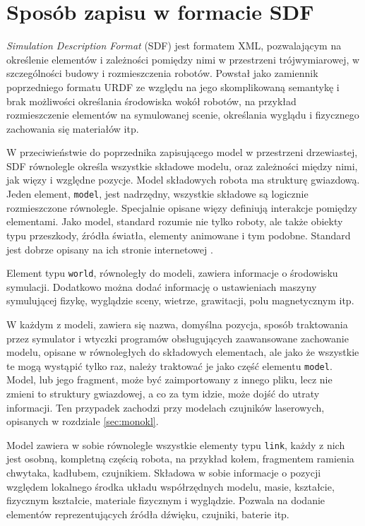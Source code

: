 \section{Sposób zapisu w formacie SDF}
	\emph{Simulation Description Format} (SDF) jest formatem XML, pozwalającym na określenie elementów i zależności pomiędzy nimi w przestrzeni trójwymiarowej, 
	w szczególności budowy i rozmieszczenia robotów.
	Powstał jako zamiennik poprzedniego formatu URDF ze względu na jego skomplikowaną semantykę i brak możliwości określania środowiska wokół robotów, 
	na przykład rozmieszczenie elementów na symulowanej scenie, określania wyglądu i fizycznego zachowania się materiałów itp.

	W przeciwieństwie do poprzednika zapisującego model w przestrzeni drzewiastej, SDF równolegle określa wszystkie składowe modelu, 
	oraz zależności między nimi, jak więzy i względne pozycje.
	Model składowych robota ma strukturę gwiazdową. Jeden element, \texttt{model}, jest nadrzędny, wszystkie składowe są logicznie rozmieszczone równolegle.
	Specjalnie opisane więzy definiują interakcje pomiędzy elementami.
	Jako model, standard rozumie nie tylko roboty, ale także obiekty typu przeszkody, źródła światła, elementy animowane i tym podobne.
	Standard jest dobrze opisany na ich stronie internetowej \cite{sdf_website}.

	Element typu \texttt{world}, równoległy do modeli, zawiera informacje o środowisku symulacji.
	Dodatkowo można dodać informację o ustawieniach maszyny symulującej fizykę, wyglądzie sceny, wietrze, grawitacji, polu magnetycznym itp.

	W każdym z modeli, zawiera się nazwa, domyślna pozycja, sposób traktowania przez symulator i wtyczki programów obsługujących zaawansowane zachowanie modelu,
	opisane w równoległych do składowych elementach, ale jako że wszystkie te mogą wystąpić tylko raz, należy traktować je jako część elementu \texttt{model}.
	Model, lub jego fragment, może być zaimportowany z innego pliku, lecz nie zmieni to struktury gwiazdowej, a co za tym idzie, może dojść do utraty informacji.
	Ten przypadek zachodzi przy modelach czujników laserowych, opisanych w rozdziale \ref{sec:monokl}.

	Model zawiera w sobie równolegle wszystkie elementy typu \texttt{link}, każdy z nich jest osobną, kompletną częścią robota, na przykład kołem, 
	fragmentem ramienia chwytaka, kadłubem, czujnikiem.
	Składowa w sobie informacje o pozycji względem lokalnego środka układu współrzędnych modelu, masie, kształcie, fizycznym kształcie, materiale fizycznym i wyglądzie.
	Pozwala na dodanie elementów reprezentujących źródła dźwięku, czujniki, baterie itp.

